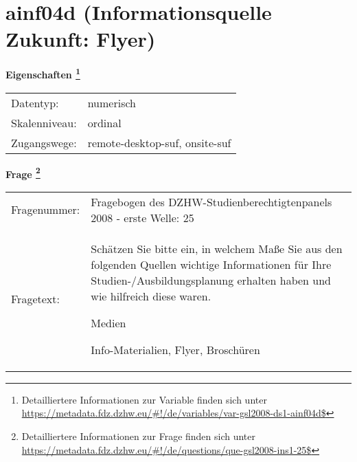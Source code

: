 
    \setcounter{footnote}{0}

    \vspace*{-1.8cm}
	\section{ainf04d (Informationsquelle Zukunft: Flyer)}
	\label{section:ainf04d}



    \vspace*{0.5cm}
    \noindent\textbf{Eigenschaften
	\footnote{Detailliertere Informationen zur Variable finden sich unter
		\url{https://metadata.fdz.dzhw.eu/\#!/de/variables/var-gsl2008-ds1-ainf04d$}}}\\
	\begin{tabularx}{\hsize}{@{}lX}
	Datentyp: & numerisch \\
	Skalenniveau: & ordinal \\
	Zugangswege: &
	  remote-desktop-suf, 
	  onsite-suf
 \\
    \end{tabularx}



				\vspace*{0.5cm}
                \noindent\textbf{Frage
	                \footnote{Detailliertere Informationen zur Frage finden sich unter
		              \url{https://metadata.fdz.dzhw.eu/\#!/de/questions/que-gsl2008-ins1-25$}}}\\
				\begin{tabularx}{\hsize}{@{}lX}
					Fragenummer: &
					  Fragebogen des DZHW-Studienberechtigtenpanels 2008 - erste Welle:
					  25
 \\
					Fragetext: & Schätzen Sie bitte ein, in welchem Maße Sie aus den folgenden Quellen wichtige Informationen für Ihre Studien-/Ausbildungsplanung erhalten haben und wie hilfreich diese waren.\par  Medien\par  Info-Materialien, Flyer, Broschüren \\
				\end{tabularx}





